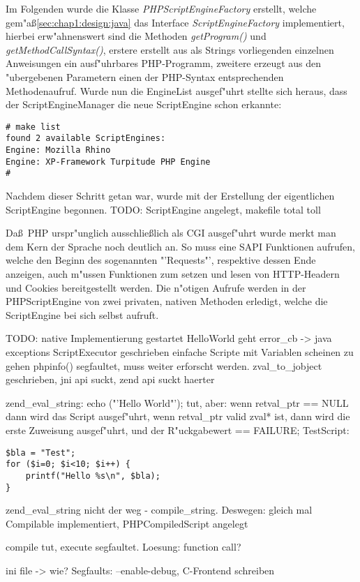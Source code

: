 Im Folgenden wurde die Klasse \emph{PHPScriptEngineFactory} erstellt, welche gem"a\ss \ref{sec:chap1:design:java} 
das Interface \emph{ScriptEngineFactory} implementiert, hierbei erw"ahnenswert sind die Methoden 
\emph{getProgram()} und \emph{getMethodCallSyntax()}, erstere erstellt aus als Strings vorliegenden
einzelnen Anweisungen ein ausf"uhrbares PHP-Programm, zweitere erzeugt aus den "ubergebenen Parametern
einen der PHP-Syntax entsprechenden Methodenaufruf. Wurde nun die EngineList ausgef"uhrt stellte sich heraus,
dass der ScriptEngineManager die neue ScriptEngine schon erkannte:
\begin{lstlisting}[caption=Neue ScriptEngine]
# make list
found 2 available ScriptEngines:
Engine: Mozilla Rhino
Engine: XP-Framework Turpitude PHP Engine
#
\end{lstlisting}

Nachdem dieser Schritt getan war, wurde mit der Erstellung der eigentlichen ScriptEngine begonnen.
TODO: ScriptEngine angelegt, makefile total toll

Da\ss\ PHP urspr"unglich ausschlie\ss lich als CGI ausgef"uhrt wurde merkt man dem Kern der Sprache noch
deutlich an. So muss eine SAPI Funktionen aufrufen, welche den Beginn des sogenannten "'Requests"', respektive
dessen Ende anzeigen, auch m"ussen Funktionen zum setzen und lesen von HTTP-Headern und Cookies bereitgestellt
werden. Die n"otigen Aufrufe werden in der PHPScriptEngine von zwei privaten, nativen Methoden erledigt, welche
die ScriptEngine bei sich selbst aufruft.

TODO:
native Implementierung gestartet
HelloWorld geht
error\_cb  -> java exceptions
ScriptExecutor geschrieben
einfache Scripte mit Variablen scheinen zu gehen
phpinfo() segfaultet, muss weiter erforscht werden.
zval\_to\_jobject geschrieben, jni api suckt, zend api suckt haerter

zend\_eval\_string: echo ("'Hello World"'); tut, aber: wenn retval\_ptr == NULL dann wird das Script ausgef"uhrt,
wenn retval\_ptr valid zval* ist, dann wird die erste Zuweisung ausgef"uhrt, und der R"uckgabewert == FAILURE;
TestScript:
\begin{lstlisting}[caption=Testscript f"ur zend\_eval\_string()]
$bla = "Test";
for ($i=0; $i<10; $i++) {
    printf("Hello %s\n", $bla);
}
\end{lstlisting}

zend\_eval\_string nicht der weg - compile\_string. Deswegen: gleich mal Compilable implementiert, PHPCompiledScript
angelegt

compile tut, execute segfaultet. Loesung: function call?

ini file -> wie?
Segfaults: --enable-debug, C-Frontend schreiben





